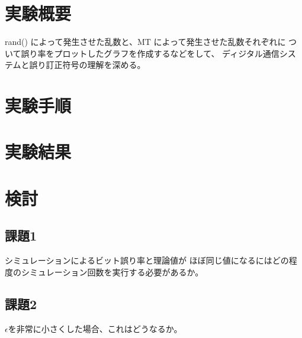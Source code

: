 \documentclass[12pt]{jarticle}
\begin{document}



\section{実験概要}
rand() によって発生させた乱数と、MT によって発生させた乱数それぞれに
ついて誤り率をプロットしたグラフを作成するなどをして、
ディジタル通信システムと誤り訂正符号の理解を深める。

\section{実験手順}

\section{実験結果}
\section{検討}
\subsection{課題1}
\begin{shadebox}
    シミュレーションによるビット誤り率と理論値が
    ほぼ同じ値になるにはどの程度のシミュレーション回数を実行する必要があるか。
\end{shadebox}
\subsection{課題2}
\begin{shadebox}
    $\epsilon$を非常に小さくした場合、これはどうなるか。
\end{shadebox}
\end{document}
